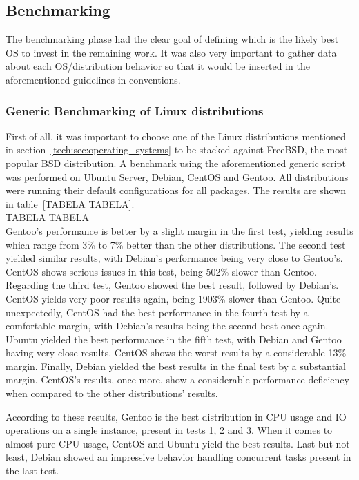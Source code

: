 \subsection{Benchmarking}
The benchmarking phase had the clear goal of defining which is the likely best OS to invest in the remaining work. It was also very important to gather data about each OS/distribution behavior so that it would be inserted in the aforementioned guidelines in conventions.

\subsubsection{Generic Benchmarking of Linux distributions}
First of all, it was important to choose one of the Linux distributions mentioned in section~\ref{tech:sec:operating_systems} to be stacked against FreeBSD, the most popular BSD distribution. A benchmark using the aforementioned generic script was performed on Ubuntu Server, Debian, CentOS and Gentoo. All distributions were running their default configurations for all packages. The results are shown in table~\ref{TABELA TABELA}.
\\
TABELA TABELA
\\
Gentoo's performance is better by a slight margin in the first test, yielding results which range from 3\% to 7\% better than the other distributions. The second test yielded similar results, with Debian's performance being very close to Gentoo's. CentOS shows serious issues in this test, being 502\% slower than Gentoo. Regarding the third test, Gentoo showed the best result, followed by Debian's. CentOS yields very poor results again, being 1903\% slower than Gentoo. Quite unexpectedly, CentOS had the best performance in the fourth test by a comfortable margin, with Debian's results being the second best once again. Ubuntu yielded the best performance in the fifth test, with Debian and Gentoo having very close results. CentOS shows the worst results by a considerable 13\% margin. Finally, Debian yielded the best results in the final test by a substantial margin. CentOS's results, once more, show a considerable performance deficiency when compared to the other distributions' results.

According to these results, Gentoo is the best distribution in CPU usage and IO operations on a single instance, present in tests 1, 2 and 3. When it comes to almost pure CPU usage, CentOS and Ubuntu yield the best results. Last but not least, Debian showed an impressive behavior handling concurrent tasks present in the last test.

